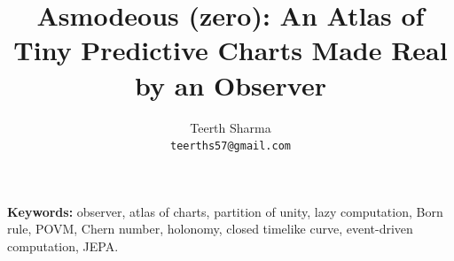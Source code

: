 \documentclass[11pt]{article}
\title{Asmodeous (zero): An Atlas of Tiny Predictive Charts Made Real by an Observer}
\author{Teerth Sharma\\ \texttt{teerths57@gmail.com}}
\date{}
\begin{document}
\maketitle

\begin{abstract}

\end{abstract}

\noindent\textbf{Keywords:} observer, atlas of charts, partition of unity, lazy computation, Born rule, POVM, Chern number, holonomy, closed timelike curve, event-driven computation, JEPA.














\end{document}
